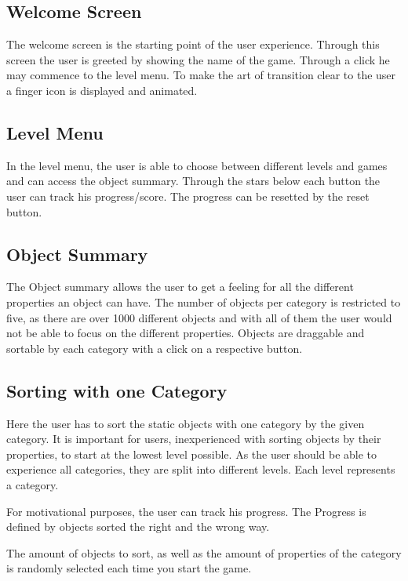 \subsection{Welcome Screen}\label{subsec:welcome-screen}
The welcome screen is the starting point of the user experience.
Through this screen the user is greeted by showing the name of the game.
Through a click he may commence to the level menu.
To make the art of transition clear to the user a finger icon is displayed and animated.

\subsection{Level Menu}\label{subsec:level-menu}
In the level menu, the user is able to choose between different levels and games and can access the object summary.
Through the stars below each button the user can track his progress/score.
The progress can be resetted by the reset button.

\subsection{Object Summary}\label{subsec:object-summary}
The Object summary allows the user to get a feeling for all the different properties an object can have.
The number of objects per category is restricted to five, as there are over 1000 different objects and with all of them
the user would not be able to focus on the different properties.
Objects are draggable and sortable by each category with a click on a respective button.

\subsection{Sorting with one Category}\label{subsec:sorting-with-one-category}
Here the user has to sort the static objects with one category by the given category.
It is important for users, inexperienced with sorting objects by their properties, to start at the lowest level possible.
As the user should be able to experience all categories, they are split into different levels.
Each level represents a category.

For motivational purposes, the user can track his progress.
The Progress is defined by objects sorted the right and the wrong way.

The amount of objects to sort, as well as the amount of properties of the category
is randomly selected each time you start the game.

